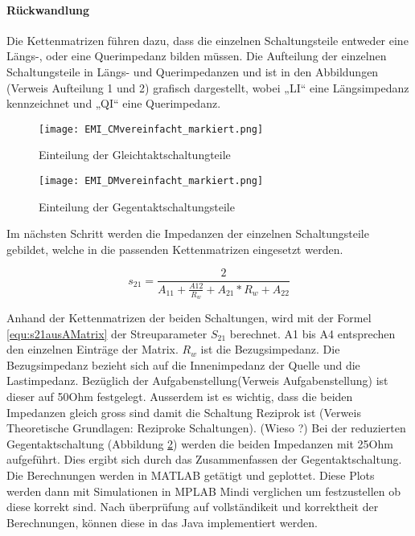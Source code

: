 \paragraph{Rückwandlung} \label{par:ruckwandlung}

Die Kettenmatrizen führen dazu, dass die einzelnen Schaltungsteile entweder eine Längs-, oder eine Querimpedanz bilden müssen. Die Aufteilung der einzelnen Schaltungsteile in Längs- und  Querimpedanzen und ist in den Abbildungen (Verweis Aufteilung 1 und 2) grafisch dargestellt, wobei „LI“ eine Längsimpedanz kennzeichnet und „QI“ eine Querimpedanz.
\begin{figure}[H]
		\centering
		\texttt{[image: EMI\_CMvereinfacht\_markiert.png]}
		\label{fig:cmschaltung}
		\caption{Einteilung der Gleichtaktschaltungteile}
\end{figure}

\begin{figure}[H]
		\centering
		\texttt{[image: EMI\_DMvereinfacht\_markiert.png]}
		\label{fig:dmschaltung}
		\caption{Einteilung der Gegentaktschaltungsteile}
\end{figure}

Im nächsten Schritt werden die Impedanzen der einzelnen Schaltungsteile gebildet, welche in die passenden Kettenmatrizen eingesetzt werden.

\begin{equation}\label{equ:s21ausAMatrix}
s_{21} = \frac{2}{A_{11}+\frac{A{12}}{R_w}+A_{21}*R_w+A_{22}}
\end{equation}



Anhand der Kettenmatrizen der beiden Schaltungen, wird mit der Formel \ref{equ:s21ausAMatrix} der Streuparameter $S_{21}$ berechnet. A1 bis A4 entsprechen den einzelnen Einträge der Matrix. $R_w$ ist die Bezugsimpedanz. Die Bezugsimpedanz bezieht sich auf die Innenimpedanz der Quelle und die Lastimpedanz. Bezüglich der Aufgabenstellung(Verweis Aufgabenstellung) ist dieser auf 50Ohm festgelegt. Ausserdem ist es wichtig, dass die beiden Impedanzen gleich gross sind damit die Schaltung Reziprok ist (Verweis Theoretische Grundlagen: Reziproke Schaltungen). (Wieso ?) 
Bei der reduzierten Gegentaktschaltung (Abbildung \ref{fig:dmschaltung}) werden die beiden Impedanzen mit 25Ohm aufgeführt. Dies ergibt sich durch das Zusammenfassen der Gegentaktschaltung.\\


Die Berechnungen werden in MATLAB getätigt und geplottet. Diese Plots werden dann mit Simulationen in MPLAB Mindi verglichen um festzustellen ob diese korrekt sind. Nach überprüfung auf vollständikeit und korrektheit der Berechnungen, können diese in das Java implementiert werden. 